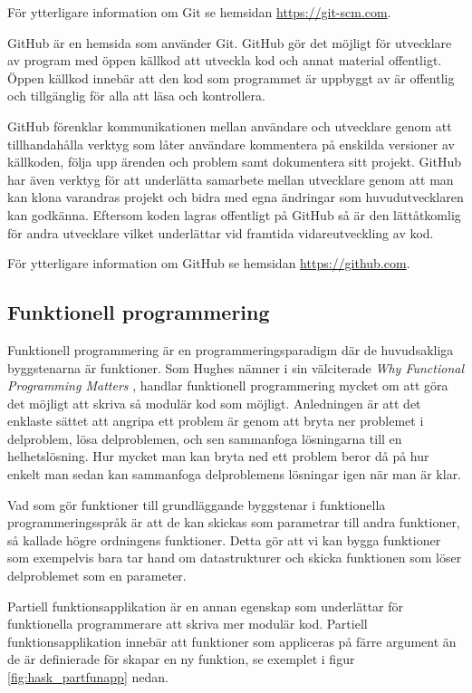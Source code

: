 \documentclass[12pt,a4paper,twoside,openright]{article}
\begin{document}
För ytterligare information om Git se hemsidan
\url{https://git-scm.com}.

\gls{GitHub} är en hemsida som använder Git. GitHub gör det möjligt
för utvecklare av program med öppen källkod att utveckla kod och annat
material offentligt. Öppen källkod innebär att den kod som programmet
är uppbyggt av är offentlig och tillgänglig för alla att läsa och
kontrollera.

GitHub förenklar kommunikationen mellan användare och utvecklare genom
att tillhandahålla verktyg som låter användare kommentera på enskilda
versioner av källkoden, följa upp ärenden och problem samt dokumentera
sitt projekt. GitHub har även verktyg för att underlätta samarbete
mellan utvecklare genom att man kan klona varandras projekt och bidra
med egna ändringar som huvudutvecklaren kan godkänna. Eftersom koden
lagras offentligt på GitHub så är den lättåtkomlig för andra
utvecklare vilket underlättar vid framtida vidareutveckling av kod.

För ytterligare information om GitHub se hemsidan
\url{https://github.com}.

\subsection{Funktionell programmering}
Funktionell programmering är en programmeringsparadigm där de
huvudsakliga byggstenarna är funktioner. Som Hughes nämner i sin
välciterade \textit{Why Functional Programming Matters}
\cite{hughes1989functional}, handlar funktionell programmering mycket
om att göra det möjligt att skriva så modulär kod som möjligt.
Anledningen är att det enklaste sättet att angripa ett problem är
genom att bryta ner problemet i delproblem, lösa delproblemen, och sen
sammanfoga lösningarna till en helhetslösning. Hur mycket man kan
bryta ned ett problem beror då på hur enkelt man sedan kan sammanfoga
delproblemens lösningar igen när man är klar.

Vad som gör funktioner till grundläggande byggstenar i funktionella
programmeringsspråk är att de kan skickas som parametrar till andra
funktioner, så kallade högre ordningens funktioner. Detta gör att vi
kan bygga funktioner som exempelvis bara tar hand om datastrukturer
och skicka funktionen som löser delproblemet som en parameter.

Partiell funktionsapplikation är en annan egenskap som underlättar för
funktionella programmerare att skriva mer modulär kod. Partiell
funktionsapplikation innebär att funktioner som appliceras på färre
argument än de är definierade för skapar en ny funktion, se exemplet i
figur \ref{fig:hask_partfunapp} nedan.
\end{document}
